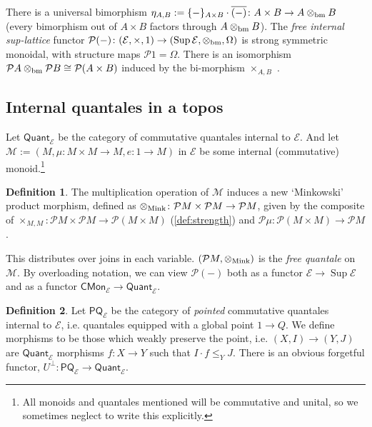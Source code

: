 \documentclass{article}
\theoremstyle{definition}
\newtheorem{definition}{Definition}[section]
\newcommand{\cE}{\mathcal{E}}
\newcommand{\cP}{\mathcal{P}}
\newcommand{\cM}{\mathcal{M}}
\newcommand{\cat}[1]{\mathsf{#1}}
\newcommand{\Sup}{\operatorname{Sup}}
\begin{document}
There is a universal bimorphism $\eta_{A,B}:=\{-\}_{A\times B}\cdot\overline{(-)}\colon A\times B\to A\otimes_{\rm bm}B$ (every bimorphism out of $A \times B$ factors through $A\otimes_{\rm bm}B$). The {\it free internal sup-lattice} functor
$\cP(-)\colon(\cE,\times,1)\to(\Sup\cE,\otimes_{\rm bm},\Omega)$ is strong symmetric monoidal, with structure maps $\cP1=\Omega$. There is an isomorphism $\cP A\otimes_{\rm bm}\cP B\cong\cP(A\times B)$ induced by the bi-morphism $\times_{A,B}$ \cite[Prop 2.iii]{joyal1984extension}.

\subsection{Internal quantales in a topos}

Let $\cat{Quant}_\cE$ be the category of commutative quantales internal to $\cE$. And let $\cM:=(M,\mu\colon M\times M\to M, e\colon 1\to M)$ in $\cE$ be some internal (commutative) monoid.\footnote{All monoids and quantales mentioned will be commutative and unital, so we sometimes neglect to write this explicitly.}

\begin{definition}
    \label{def:mink}
 The multiplication operation of $\cM$ induces a new `Minkowski' product morphism, defined as $\otimes_{\rm Mink}\colon \cP M\times \cP M  \to \cP M$, given by the composite of $\times_{M,M}\colon \cP M\times \cP M \rightarrow \cP (M\times M) $ (\cref{def:strength}) and  $\cP \mu\colon \cP (M\times M)\rightarrow \cP M$.
    
\end{definition}

 This distributes over joins in each variable. $(\cP M, \otimes_{\rm Mink})$ is the {\it free quantale} on $\cM$. By overloading notation, we can view $\cP(-)$ both as a functor $\cE\to\Sup\cE$ and as a functor $\cat{CMon}_\cE\to \cat{Quant}_\cE$.

\begin{definition}
    \label{def:pq}
    Let $\cat{PQ}_\cE$ be the category of {\it pointed} commutative quantales internal to $\cE$, i.e. quantales equipped with a global point $1\to Q$. We define morphisms to be those which weakly preserve the point, i.e. $(X,I)\to(Y,J)$ are $\cat{Quant}_\cE$ morphisms $f\colon X\to Y$ such that $I\cdot f \leq_Y J$. There is an obvious forgetful functor, $U^\bot\colon \cat{PQ}_\cE \to \cat{Quant}_\cE$. 


\end{definition}
\end{document}
